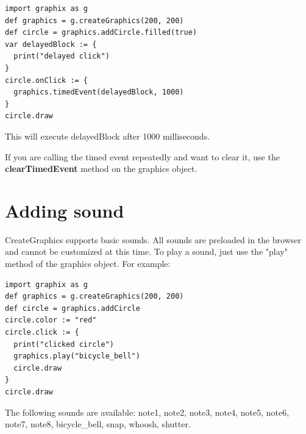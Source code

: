\documentclass{article}
\begin{document}
\begin{lstlisting}
import graphix as g
def graphics = g.createGraphics(200, 200)
def circle = graphics.addCircle.filled(true)
var delayedBlock := {
  print("delayed click")
}
circle.onClick := { 
  graphics.timedEvent(delayedBlock, 1000)
}
circle.draw
\end{lstlisting}
This will execute delayedBlock after 1000 milliseconds.

If you are calling the timed event repeatedly and want to clear it, use the \textbf{clearTimedEvent}
method on the graphics object.

\section{Adding sound}
CreateGraphics supports basic sounds. All sounds are preloaded in the browser and cannot be customized at this time.
To play a sound, just use the "play" method of the graphics object. For example:
\begin{lstlisting}
import graphix as g
def graphics = g.createGraphics(200, 200)
def circle = graphics.addCircle
circle.color := "red"
circle.click := { 
  print("clicked circle") 
  graphics.play("bicycle_bell")
  circle.draw
}
circle.draw
\end{lstlisting}


The following sounds are available: note1, note2, note3, note4, note5, note6, note7, note8, bicycle\_bell, snap, 
whoosh, shutter.
\end{document}
